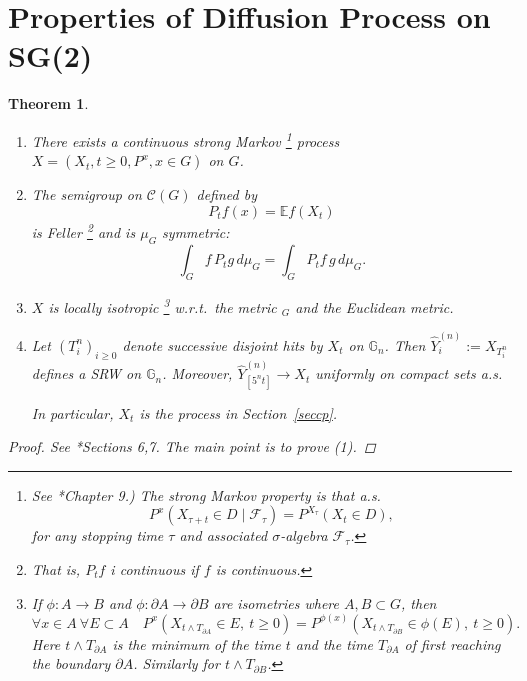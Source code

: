 \documentclass[a4paper]{amsart}
\theoremstyle{plain}
\newtheorem{theorem}{Theorem}[section]
\theoremstyle{definition}
\theoremstyle{remark}
\begin{document}
\section{\textbf{Properties  of Diffusion Process on SG(2)}}
\begin{theorem}\mbox{}
 \begin{enumerate}

\item  There exists a continuous strong Markov%
\footnote{See \cite{Lam}*{Chapter 9}.) The strong Markov property is that a.s.
\[  P^x(X_{\tau + t} \in D \mid \mathcal{F} _\tau) = P^{X_\tau}(X_t \in D ) ,\]
for any stopping time $ \tau $ and associated $ \sigma $-algebra $ \mathcal{F}  _\tau $.}
process $ X = (X_t, t\geq 0, P^x, x \in G ) $ on $ G $.

\item The semigroup on $ \mathcal{C} (G) $ defined by
\[ P_tf(x) = \mathbb{E} f(X_t) \]
is Feller%
\footnote{That is, $ P_t f $ i continuous if $ f $ is continuous.}
and is $ \mu_G $ symmetric:
\[  \int_G f\, P_t g \, d\mu_G =  \int_G P_tf\,  g \, d\mu_G.\]

\item $ X $ is locally isotropic%
\footnote{If $ \phi:A\to B $  and $ \phi : \partial A \to \partial B $ are isometries  where $ A,B \subset G $, then 
\[ \forall x \in A \ \forall E \subset A \quad P^x( X_{t \wedge T_{\partial A}}\in E,\  t\geq 0)
=  P^{\phi(x)} ( X_{t \wedge T_{\partial B}}\in \phi(E),\  t\geq 0).
\]
Here $t \wedge T_{\partial A}  $ is the minimum of the time $ t $   and the time $  T_{\partial A} $ of first reaching the boundary $ \partial A $. Similarly for $t \wedge T_{\partial B} $.
}
 w.r.t.\ the metric $ _G $ and the Euclidean metric.

\item Let $ (T^n_i)_{i\geq 0} $ denote successive disjoint hits by $ X_t $ on $ \mathbb{G}_n $.  Then 
$ \widehat{Y}_i^{(n)} := X_{T^n_i} $  defines a SRW on $ \mathbb{G}_n  $. Moreover, $ \widehat{Y}_{[5^n t]}^{(n)} \to X_t $ uniformly on compact sets a.s.

In particular, $ X_t $ is the process in Section~\ref{seccp}.
\end{enumerate} 

\begin{proof} See \cite{Bar1}*{Sections 6,7}. The main point is to prove (1).   \end{proof}


 




\end{theorem} 
\end{document}
